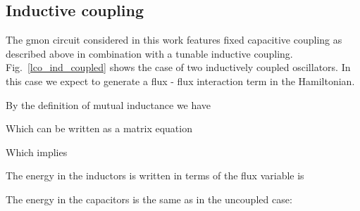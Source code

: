 \subsection{Inductive coupling}
The gmon circuit considered in this work features fixed capacitive coupling as described above in combination with a tunable inductive coupling.
Fig.~\ref{lco_ind_coupled} shows the case of two inductively coupled oscillators.
In this case we expect to generate a flux - flux interaction term in the Hamiltonian.

By the definition of mutual inductance we have

Which can be written as a matrix equation

Which implies

The energy in the inductors is written in terms of the flux variable is

The energy in the capacitors is the same as in the uncoupled case:

